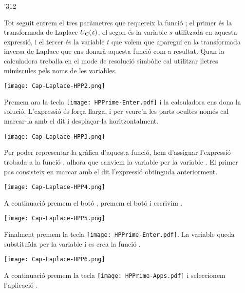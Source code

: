 \begin{exemple}
\begin{dingautolist}{'312}
         \item Tot seguit entrem el tres paràmetres que requereix la funció ; el primer és la transformada de Laplace  $U_\mathrm{C}(s)$, el segon és la variable $s$ utilitzada en aquesta expressió, i el tercer és la variable $t$ que volem que aparegui en la transformada inversa de Laplace que ens donarà aquesta funció com a resultat. Quan la calculadora treballa en el  mode de resolució simbòlic cal utilitzar lletres minúscules pels noms de les variables.

            \texttt{[image: Cap-Laplace-HPP2.png]}\vspace{5mm}

         \item Premem ara la tecla \texttt{[image: HPPrime-Enter.pdf]} i la calculadora ens dona la solució. L'expressió és força llarga, i per veure'n les parts ocultes només cal marcar-la amb el dit i desplaçar-la horitzontalment.

            \texttt{[image: Cap-Laplace-HPP3.png]}\vspace{5mm}

         \item Per  poder representar la gràfica d'aquesta funció, hem d'assignar l'expressió trobada a la  funció , alhora que canviem la variable  per la variable . El primer pas consisteix en marcar amb el dit l'expressió obtinguda anteriorment.

            \texttt{[image: Cap-Laplace-HPP4.png]}\vspace{5mm}

         \item A continuació premem el botó  , premem el botó  i  escrivim  .

             \texttt{[image: Cap-Laplace-HPP5.png]}\vspace{5mm}

         \item Finalment premem la tecla \texttt{[image: HPPrime-Enter.pdf]}. La variable  queda substituïda per la variable  i es crea la funció .

          \texttt{[image: Cap-Laplace-HPP6.png]}\vspace{5mm}


         \item A continuació premem  la tecla \texttt{[image: HPPrime-Apps.pdf]} i seleccionem  l'aplicació .


\end{dingautolist}
\end{exemple}
